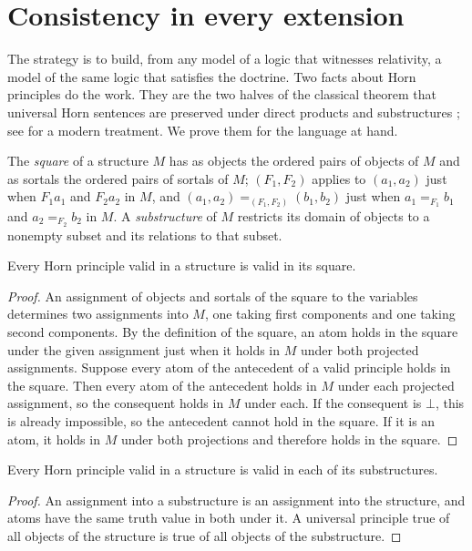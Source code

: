 \documentclass{situationist-preprint}
\begin{document}
\section{Consistency in every extension}

The strategy is to build, from any model of a logic that witnesses relativity, a model of the same logic that satisfies the doctrine. Two facts about Horn principles do the work. They are the two halves of the classical theorem that universal Horn sentences are preserved under direct products and substructures \citep{McKinsey1943,Horn1951}; see \citet[ch.~9]{Hodges1993} for a modern treatment. We prove them for the language at hand.

The \emph{square} of a structure $M$ has as objects the ordered pairs of objects of $M$ and as sortals the ordered pairs of sortals of $M$; $(F_1, F_2)$ applies to $(a_1, a_2)$ just when $F_1 a_1$ and $F_2 a_2$ in $M$, and $(a_1, a_2) =_{(F_1, F_2)} (b_1, b_2)$ just when $a_1 =_{F_1} b_1$ and $a_2 =_{F_2} b_2$ in $M$. A \emph{substructure} of $M$ restricts its domain of objects to a nonempty subset and its relations to that subset.

\begin{lemma}\label{l:square}
Every Horn principle valid in a structure is valid in its square.
\end{lemma}

\begin{proof}
An assignment of objects and sortals of the square to the variables determines two assignments into $M$, one taking first components and one taking second components. By the definition of the square, an atom holds in the square under the given assignment just when it holds in $M$ under both projected assignments. Suppose every atom of the antecedent of a valid principle holds in the square. Then every atom of the antecedent holds in $M$ under each projected assignment, so the consequent holds in $M$ under each. If the consequent is $\bot$, this is already impossible, so the antecedent cannot hold in the square. If it is an atom, it holds in $M$ under both projections and therefore holds in the square.
\end{proof}

\begin{lemma}\label{l:sub}
Every Horn principle valid in a structure is valid in each of its substructures.
\end{lemma}

\begin{proof}
An assignment into a substructure is an assignment into the structure, and atoms have the same truth value in both under it. A universal principle true of all objects of the structure is true of all objects of the substructure.
\end{proof}
\end{document}
